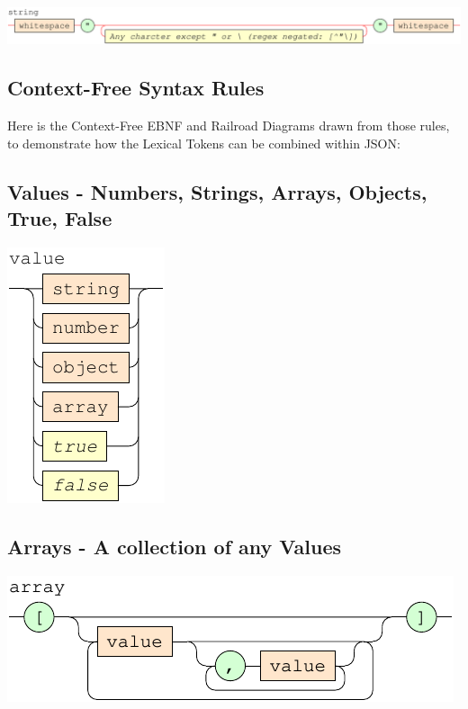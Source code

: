 \documentclass[a4paper]{article}
\begin{document}

{\centering

   \includegraphics[scale=0.8]{EBNF/string}

}

\subsection{Context-Free Syntax Rules}

Here is the Context-Free EBNF and Railroad Diagrams drawn from those rules,
to demonstrate how the Lexical Tokens can be combined within JSON:

\subsection*{Values - Numbers, Strings, Arrays, Objects, True, False }

{\centering

   \includegraphics[scale=0.9]{EBNF/value}

}

\subsection*{Arrays - A collection of any Values }


{\centering

   \includegraphics[scale=0.9]{EBNF/array}

}
\end{document}
